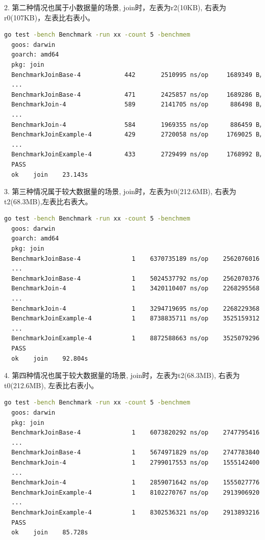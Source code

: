 \documentclass[UTF8]{ctexart}
\begin{document}
2. 第二种情况也属于小数据量的场景, join时，左表为r2(10KB), 右表为r0(107KB)，左表比右表小。
\begin{lstlisting}[language={bash}]
  go test -bench Benchmark -run xx -count 5 -benchmem
  goos: darwin
  goarch: amd64
  pkg: join
  BenchmarkJoinBase-4      	     442	   2510995 ns/op	 1689349 B/op	   21121 allocs/op
  ...
  BenchmarkJoinBase-4      	     471	   2425857 ns/op	 1689286 B/op	   21121 allocs/op
  BenchmarkJoin-4          	     589	   2141705 ns/op	  886498 B/op	   21097 allocs/op
  ...
  BenchmarkJoin-4          	     584	   1969355 ns/op	  886459 B/op	   21096 allocs/op
  BenchmarkJoinExample-4   	     429	   2720058 ns/op	 1769025 B/op	   31110 allocs/op
  ...
  BenchmarkJoinExample-4   	     433	   2729499 ns/op	 1768992 B/op	   31110 allocs/op
  PASS
  ok  	join	23.143s
\end{lstlisting}

3. 第三种情况属于较大数据量的场景, join时，左表为t0(212.6MB), 右表为t2(68.3MB),左表比右表大。
\begin{lstlisting}[language={bash}]
  go test -bench Benchmark -run xx -count 5 -benchmem
  goos: darwin
  goarch: amd64
  pkg: join
  BenchmarkJoinBase-4      	       1	6370735189 ns/op	2562076016 B/op	21603453 allocs/op
  ...
  BenchmarkJoinBase-4      	       1	5024537792 ns/op	2562070376 B/op	21603540 allocs/op
  BenchmarkJoin-4          	       1	3420110407 ns/op	2268295568 B/op	21914390 allocs/op
  ...
  BenchmarkJoin-4          	       1	3294719695 ns/op	2268229368 B/op	21913928 allocs/op
  BenchmarkJoinExample-4   	       1	8738835711 ns/op	3525159312 B/op	26919518 allocs/op
  ...
  BenchmarkJoinExample-4   	       1	8872588663 ns/op	3525079296 B/op	26918959 allocs/op
  PASS
  ok  	join	92.804s
\end{lstlisting}

4. 第四种情况也属于较大数据量的场景, join时，左表为t2(68.3MB), 右表为t0(212.6MB), 左表比右表小。
\begin{lstlisting}[language={bash}]
  go test -bench Benchmark -run xx -count 5 -benchmem
  goos: darwin
  pkg: join
  BenchmarkJoinBase-4      	       1	6073820292 ns/op	2747795416 B/op	21705016 allocs/op
  ...
  BenchmarkJoinBase-4      	       1	5674971829 ns/op	2747783840 B/op	21704950 allocs/op
  BenchmarkJoin-4          	       1	2799017553 ns/op	1555142400 B/op	21715882 allocs/op
  ...
  BenchmarkJoin-4          	       1	2859071642 ns/op	1555027776 B/op	21715088 allocs/op
  BenchmarkJoinExample-4   	       1	8102270767 ns/op	2913906920 B/op	34687841 allocs/op
  ...
  BenchmarkJoinExample-4   	       1	8302536321 ns/op	2913893216 B/op	34687747 allocs/op
  PASS
  ok  	join	85.728s
\end{lstlisting}
\end{document}
